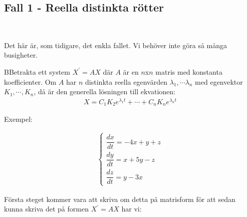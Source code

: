 \subsection{Fall 1 - Reella distinkta rötter}\hfill\\
\par\bigskip
\noindent Det här är, som tidigare, det enkla fallet. Vi behöver inte göra så många busigheter.
\par\bigskip
\begin{theo}
  BBetrakta ett system $X^{\prime} = AX$ där $A$ är en $n$x$n$ matris med konstanta koefficienter. Om $A$ har $n$ distinkta reella egenvärden $\lambda_1,\cdots\lambda_n$ med egenvektor $K_1,\cdots, K_n$, då är den generella lösningen till ekvationen:
  \begin{equation*}
    \begin{gathered}
      X = C_1K_2e^{\lambda_1 t}+\cdots + C_nK_ne^{\lambda_n t}
    \end{gathered}
  \end{equation*}
\end{theo}
\par\bigskip
\noindent Exempel:\par
\begin{equation*}
  \begin{gathered}
    \begin{cases*}
      \dfrac{dx}{dt} = -4x+y+z\\
      \dfrac{dy}{dt}=x+5y-z\\
      \dfrac{dz}{dt}=y-3x
    \end{cases*}
  \end{gathered}
\end{equation*}
\par\bigskip
\noindent Första steget kommer vara att skriva om detta på matrisform för att sedan kunna skriva det på formen $X^{\prime} = AX$ har vi:

